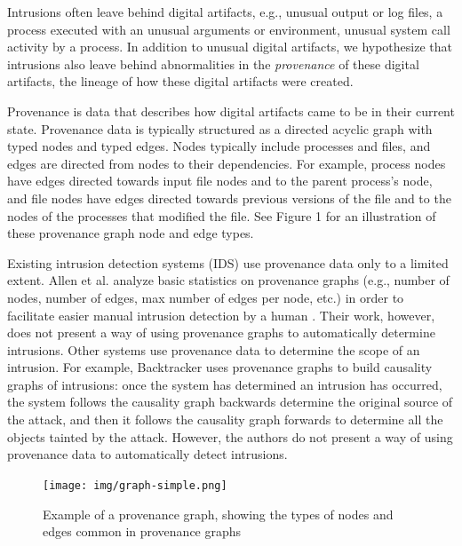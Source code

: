 \documentclass[10pt,twocolumn]{article}
\begin{document}
Intrusions often leave behind digital artifacts, e.g., unusual output or log files, a process executed
with an unusual arguments or environment, unusual system call activity by a process. In addition to
unusual digital artifacts, we hypothesize that
intrusions also leave behind abnormalities
in the {\em provenance} of these digital artifacts, the lineage of how these digital artifacts were created.

Provenance is data that describes how digital artifacts
came to be in their current state. Provenance data is typically structured as a directed acyclic graph with
typed nodes and typed edges.
Nodes typically include processes and files, and edges are directed from nodes to their dependencies. For example,
process nodes have edges directed towards input file nodes and to the parent process's node, and
file nodes have edges directed towards previous versions of the file and to the nodes of the
processes that modified the file. See Figure 1 for an illustration of these provenance
graph node and edge types.

Existing intrusion detection systems (IDS) use provenance data only to a limited extent.
Allen et al. analyze
basic statistics on provenance graphs (e.g., number of nodes, number of edges, max number of edges per node, etc.) in order to facilitate
easier manual intrusion detection by a human \cite{provstat}. Their work, however, does not present a way of using provenance
graphs to automatically determine intrusions. Other systems use provenance data to determine the scope of an
intrusion. For example, Backtracker \cite{backtracker} uses provenance graphs to build causality graphs of intrusions: once the
system has
determined an intrusion has occurred, the system follows the causality graph backwards determine the original source of the attack, and 
then it follows the causality graph forwards to determine all the objects tainted by the attack. However, the authors 
do not present a way of using provenance data to automatically detect intrusions.

\begin{figure}
  \label{graph-simple}
  \centering
    \texttt{[image: img/graph-simple.png]}
    \caption{Example of a provenance graph, showing the types of nodes and edges common in provenance graphs} 
\end{figure}
\end{document}
